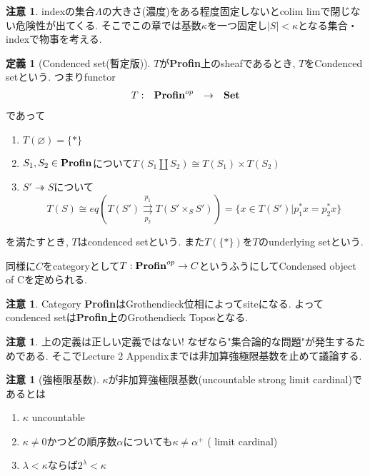 \documentclass[dvipdfmx,a4paper,11pt]{article}
\theoremstyle{definition}
\newtheorem{dfn}[thm]{定義}
\newtheorem{rem}[thm]{注意}
\begin{document}
 \begin{rem}
 indexの集合$\Lambda$の大きさ(濃度)をある程度固定しないとcolim limで閉じない危険性が出てくる.
 そこでこの章では基数$\kappa$を一つ固定し$|S| < \kappa$となる集合・indexで物事を考える.
 \end{rem}
 
 \begin{tcolorbox}
 [colback = white, colframe = green!35!black, fonttitle = \bfseries,breakable = true]
\begin{dfn}[Condenced set(暫定版)] \cite[Definition 1.2]{Sch19}
$T$が{\bf Profin}上のsheafであるとき, $T$をCondenced setという. 
つまりfunctor
 $$
\begin{array}{cccc}
T : &{\bf Profin}^{op}& \rightarrow &{\bf Set}  \\
\end{array}
$$
であって
\begin{enumerate}
\item $T(\varnothing) = \{ \ast\}$
\item $S_1, S_2 \in {\bf Profin}$について$T(S_1 \coprod S_2) \cong T(S_1) \times T(S_2)$
\item $S' \twoheadrightarrow S$について
$$
T(S) \cong eq(T(S')\underset{p_2}{\overset{p_1}{\rightrightarrows}} T(S' \times_{S} S'))
=\{ x \in T(S') | p_{1}^{*}x = p_{2}^{*}x\}
$$
\end{enumerate}
を満たすとき, $T$はcondenced setという. 
また$T(\{\ast\})$を$T$のunderlying setという. 
 \end{dfn}
 \end{tcolorbox}
 同様に$C$をcategoryとして$T : {\bf Profin}^{op} \rightarrow  C$というふうにしてCondensed object of Cを定められる.
 \begin{rem}
Category {\bf Profin}はGrothendieck位相によってsiteになる.
よってcondenced setは{\bf Profin}上のGrothendieck Toposとなる.
  \end{rem}
  
 \begin{rem}\cite[Remark 1.3]{Sch19}
 上の定義は正しい定義ではない! なぜなら"集合論的な問題"が発生するためである. 
 そこでLecture 2 Appendixまでは非加算強極限基数を止めて議論する. 
 \end{rem}


 
 \begin{tcolorbox}
 [colback = white, colframe = green!35!black, fonttitle = \bfseries,breakable = true]
\begin{rem}[強極限基数]
$\kappa$が非加算強極限基数(uncountable strong limit cardinal)であるとは
\begin{enumerate}
\item $\kappa$ uncountable
\item $\kappa \neq 0$かつどの順序数$\alpha$についても$\kappa \neq \alpha^{+}$ ( limit cardinal)
\item  $\lambda < \kappa$ならば$2^{\lambda} < \kappa$
\end{enumerate}
 \end{rem}
 \end{tcolorbox}
 
\end{document}
